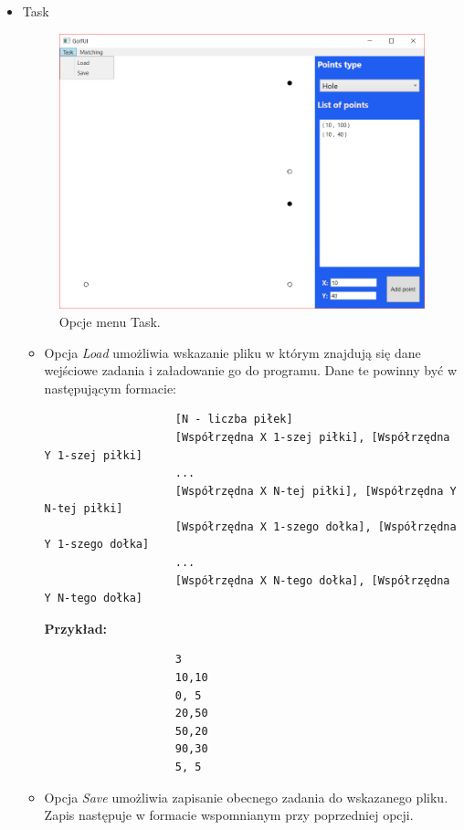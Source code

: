\documentclass[10pt,a4paper]{article}
\begin{document}
	\begin{itemize}
		\item{Task}
		
			\begin{figure}[H]
				\centering	
 				\includegraphics[scale=0.6]{images/task.png}
 				\caption{Opcje menu Task.}
 				\label{fig:task_menu}
			\end{figure} 
			
			\begin{itemize}
				\item Opcja \textit{Load} umożliwia wskazanie pliku w którym znajdują się dane wejściowe zadania i załadowanie go do programu. Dane te powinny być w następującym formacie:
	
				\begin{verbatim}
					[N - liczba piłek]
					[Współrzędna X 1-szej piłki], [Współrzędna Y 1-szej piłki]
					...
					[Współrzędna X N-tej piłki], [Współrzędna Y N-tej piłki]
					[Współrzędna X 1-szego dołka], [Współrzędna Y 1-szego dołka]
					...
					[Współrzędna X N-tego dołka], [Współrzędna Y N-tego dołka]
				\end{verbatim}	
			
				\textbf{Przykład:} 		
				\begin{verbatim}
					3
					10,10
					0, 5
					20,50
					50,20
					90,30
					5, 5
				\end{verbatim}
		
				\item Opcja \textit{Save} umożliwia zapisanie obecnego zadania do wskazanego pliku. Zapis następuje w formacie wspomnianym przy poprzedniej opcji.
			\end{itemize}
		

\end{itemize}
\end{document}

